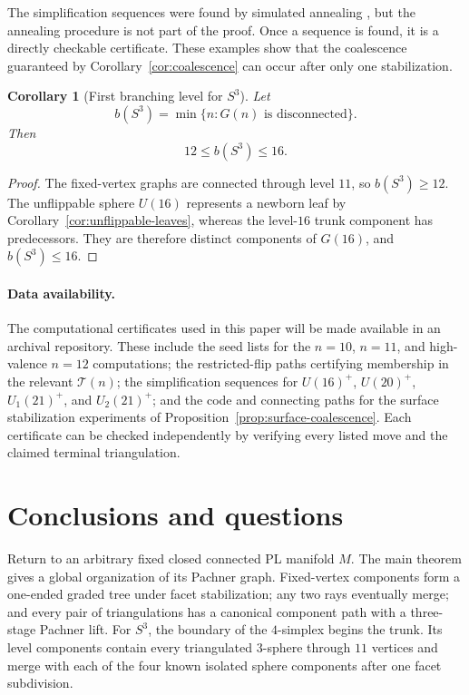 \documentclass[11pt]{article}
\newtheorem{corollary}[theorem]{Corollary}
\theoremstyle{remark}
\theoremstyle{plain}
\begin{document}
The simplification sequences were found by simulated annealing
\cite{BL00,JLL22}, but the annealing procedure is not part of the proof.  Once
a sequence is found, it is a directly checkable certificate.  These examples
show that the coalescence guaranteed by Corollary~\ref{cor:coalescence}
can occur after only one stabilization.

\begin{corollary}[First branching level for \(S^3\)]
\label{cor:first-branching-bound}
Let
\[
 b(S^3)=\min\{n:G(n)\text{ is disconnected}\}.
\]
Then
\[
 12\le b(S^3)\le16.
\]
\end{corollary}

\smallskip
\begin{proof}
The fixed-vertex graphs are connected through level \(11\), so
\(b(S^3)\ge12\).  The unflippable sphere \(U(16)\) represents a newborn leaf
by Corollary~\ref{cor:unflippable-leaves}, whereas the level-\(16\) trunk
component has predecessors.  They are therefore distinct components of
\(G(16)\), and \(b(S^3)\le16\).
\end{proof}

\paragraph{Data availability.}
The computational certificates used in this paper will be made available in
an archival repository.  These include the seed lists for the \(n=10\),
\(n=11\), and high-valence \(n=12\) computations; the restricted-flip paths
certifying membership in the relevant \(\mathcal T(n)\); the simplification
sequences for \(U(16)^{+}\), \(U(20)^{+}\), \(U_1(21)^{+}\), and \(U_2(21)^{+}\);
and the code and connecting paths for the surface stabilization experiments
of Proposition~\ref{prop:surface-coalescence}.  Each certificate can be
checked independently by verifying every listed move and the claimed terminal
triangulation.

\section{Conclusions and questions}
\label{sec:conclusions}

Return to an arbitrary fixed closed connected PL manifold \(M\).  The main
theorem gives a global organization of its Pachner graph.  Fixed-vertex
components form a one-ended graded tree under facet stabilization; any two rays eventually merge; and every pair of
triangulations has a canonical component path with a three-stage Pachner
lift.  For \(S^3\), the boundary of the \(4\)-simplex begins the trunk.  Its level components
contain every triangulated \(3\)-sphere through \(11\) vertices and merge
with each of the four known isolated sphere components after one facet
subdivision.
\end{document}
